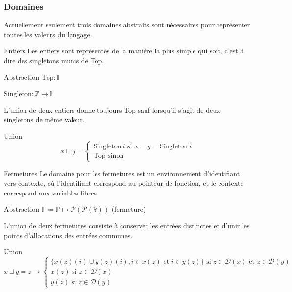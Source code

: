 \documentclass{beamer}
\begin{document}
\subsubsection{Domaines}

Actuellement seulement trois domaines abstraits sont nécessaires pour représenter toutes les valeurs du langage.

\begin{frame}{Entiers}
    Les entiers sont représentés de la manière la plus simple qui soit, c'est à dire des singletons munis de Top.
    
    \begin{block}{Abstraction}
        $\text{Top} : \mathbb{I}$

        $\text{Singleton} : \mathbb{Z} \mapsto \mathbb{I}$
    \end{block}

    L'union de deux entiers donne toujours Top sauf lorsqu'il s'agit de deux singletons de même valeur.

    \begin{block}{Union}
        $$
        x \sqcup y =
        \begin{cases}
            \text{Singleton} ~ i \text{ si } x = y = \text{Singleton} ~ i  \\
            \text{Top} \text{ sinon}
        \end{cases}
        $$
    \end{block}
\end{frame}

\begin{frame}{Fermetures}
    Le domaine pour les fermetures est un environnement d'identifiant vers contexte, où l'identifiant correspond au pointeur de fonction, et le contexte correspond aux variables libres.
    \begin{block}{Abstraction}
        $\mathbb{F} \coloneqq \mathbb{P} \mapsto \mathcal{P}(\mathcal{P}(\mathbb{V}))$ (fermeture)
    \end{block}

    L'union de deux fermetures consiste à conserver les entrées distinctes et d'unir les points d'allocations des entrées communes.%
    
    \begin{block}{Union}
        $$
        x \sqcup y = z \rightarrow
        \begin{cases}
            \lbrace x(z)(i) \cup y(z)(i), i \in x(z) \text{ et } i \in y(z) \rbrace \text{ si } z \in \mathcal{D}(x) \text{ et } z \in \mathcal{D}(y) \\
            x(z) \text{ si } z \in \mathcal{D}(x) \\
            y(z) \text{ si } z \in \mathcal{D}(y)
        \end{cases}
        $$
    \end{block}
\end{frame}
\end{document}
